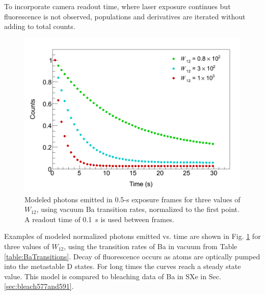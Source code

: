 \noindent
To incorporate camera readout time, where laser exposure continues but fluorescence is not observed, populations and derivatives are iterated without adding to total counts.

\begin{figure} %
        \centering
                \includegraphics[width=.7\textwidth]{figures/thesis_modelExamples.png}
                \caption{Modeled photons emitted in 0.5-s exposure frames for three values of $W_{12}$, using vacuum Ba transition rates, normalized to the first point.  A readout time of 0.1~s is used between frames. }
\label{fig:modelExample}
\end{figure}

Examples of modeled normalized photons emitted vs. time are shown in Fig. \ref{fig:modelExample} for three values of $W_{12}$, using the transition rates of Ba in vacuum from Table \ref{table:BaTransitions}.  Decay of fluorescence occurs as atoms are optically pumped into the metastable D states.  For long times the curves reach a steady state value.  This model is compared to bleaching data of Ba in SXe in Sec. \ref{sec:bleach577and591}.


